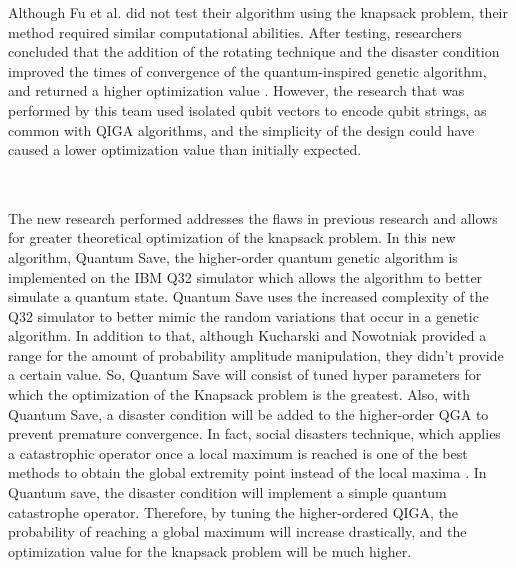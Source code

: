 \vspace{1mm}

Although Fu et al. \cite{wu_improvement_2013} did not test their algorithm using the knapsack problem, their method required similar computational abilities. After testing, researchers concluded that the addition of the rotating technique and the disaster condition improved the times of convergence of the quantum-inspired genetic algorithm, and returned a higher optimization value \cite{wu_improvement_2013}. However, the research that was performed by this team used isolated qubit vectors to encode qubit strings, as common with QIGA algorithms, and the simplicity of the design could have caused a lower optimization value than initially expected.

\subsection*{\color{SubSectionBlue}{Uniqueness of This Researcher's Current Work}}
 \\

The new research performed addresses the flaws in previous research and allows for greater theoretical optimization of the knapsack problem. In this new algorithm, Quantum Save, the higher-order quantum genetic algorithm is implemented on the IBM Q32 simulator which allows the algorithm to better simulate a quantum state. Quantum Save uses the increased complexity of the Q32 simulator to better mimic the random variations that occur in a genetic algorithm. In addition to that, although Kucharski and Nowotniak \cite{nowotniak_higher-order_2014} provided a range for the amount of probability amplitude manipulation, they didn’t provide a certain value. So, Quantum Save will consist of tuned hyper parameters for which the optimization of the Knapsack problem is the greatest. Also, with Quantum Save, a disaster condition will be added to the higher-order QGA to prevent premature convergence. In fact, social disasters technique, which applies a catastrophic operator once a local maximum is reached is one of the best methods to obtain the global extremity point instead of the local maxima \cite{rocha_preventing_1999}. In Quantum save, the disaster condition will implement a simple quantum catastrophe operator. Therefore, by tuning the higher-ordered QIGA, the probability of reaching a global maximum will increase drastically, and the optimization value for the knapsack problem will be much higher.

